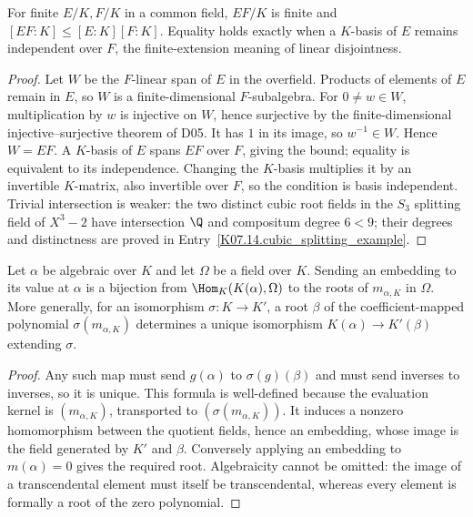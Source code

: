 \begin{theorem}
For finite $E/K,F/K$ in a common field, $EF/K$ is finite and $[EF:K]\leq[E:K][F:K]$. Equality holds exactly when a $K$-basis of $E$ remains independent over $F$, the finite-extension meaning of linear disjointness.
\end{theorem}
\begin{proof}
Let $W$ be the $F$-linear span of $E$ in the overfield. Products of elements of $E$ remain in $E$, so $W$ is a finite-dimensional $F$-subalgebra. For $0\ne w\in W$, multiplication by $w$ is injective on $W$, hence surjective by the finite-dimensional injective--surjective theorem of D05. It has $1$ in its image, so $w^{-1}\in W$. Hence $W=EF$. A $K$-basis of $E$ spans $EF$ over $F$, giving the bound; equality is equivalent to its independence. Changing the $K$-basis multiplies it by an invertible $K$-matrix, also invertible over $F$, so the condition is basis independent. Trivial intersection is weaker: the two distinct cubic root fields in the $S_3$ splitting field of $X^3-2$ have intersection $\Q$ and compositum degree $6<9$; their degrees and distinctness are proved in Entry~\ref{K07.14.cubic_splitting_example}.
\end{proof}
\begin{theorem}
Let $\alpha$ be algebraic over $K$ and let $\Omega$ be a field over $K$. Sending an embedding to its value at $\alpha$ is a bijection from $\Hom_K(K(\alpha),\Omega)$ to the roots of $m_{\alpha,K}$ in $\Omega$. More generally, for an isomorphism $\sigma:K\to K'$, a root $\beta$ of the coefficient-mapped polynomial $\sigma(m_{\alpha,K})$ determines a unique isomorphism $K(\alpha)\to K'(\beta)$ extending $\sigma$.
\end{theorem}
\begin{proof}
Any such map must send $g(\alpha)$ to $\sigma(g)(\beta)$ and must send inverses to inverses, so it is unique. This formula is well-defined because the evaluation kernel is $(m_{\alpha,K})$, transported to $(\sigma(m_{\alpha,K}))$. It induces a nonzero homomorphism between the quotient fields, hence an embedding, whose image is the field generated by $K'$ and $\beta$. Conversely applying an embedding to $m(\alpha)=0$ gives the required root. Algebraicity cannot be omitted: the image of a transcendental element must itself be transcendental, whereas every element is formally a root of the zero polynomial.
\end{proof}

